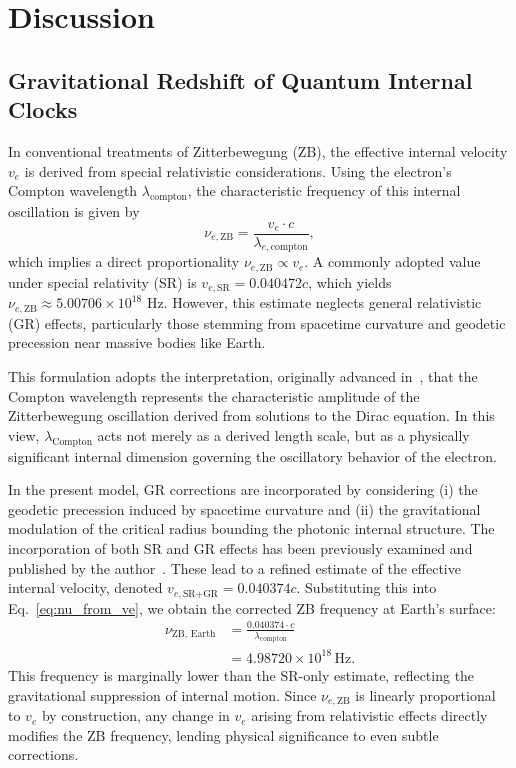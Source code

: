 \documentclass[%
 reprint,
 amsmath,amssymb,
 aps,
]{revtex4-1}
\numberwithin{equation}{section}%
\begin{document}
\section{Discussion}

\subsection{Gravitational Redshift of Quantum Internal Clocks}

In conventional treatments of Zitterbewegung (ZB), the effective internal velocity $v_e$ is derived from special relativistic considerations. Using the electron's Compton wavelength $\lambda_{\mathrm{compton}}$, the characteristic frequency of this internal oscillation is given by
\begin{equation}
\nu_{e,\text{ZB}} = \frac{v_e \cdot c}{\lambda_{e, \mathrm{compton}}},
\label{eq:nu_from_ve}
\end{equation}
which implies a direct proportionality $\nu_{e,\text{ZB}} \propto v_e$. A commonly adopted value under special relativity (SR) is $v_{e,\text{SR}} = 0.040472c$, which yields $\nu_{e,\text{ZB}} \approx 5.00706 \times 10^{18}$ Hz. However, this estimate neglects general relativistic (GR) effects, particularly those stemming from spacetime curvature and geodetic precession near massive bodies like Earth.

This formulation adopts the interpretation, originally advanced in~\cite{hanamura1811.0312}, that the Compton wavelength represents the characteristic amplitude of the Zitterbewegung oscillation derived from solutions to the Dirac equation. In this view, $\lambda_{\text{Compton}}$ acts not merely as a derived length scale, but as a physically significant internal dimension governing the oscillatory behavior of the electron.

In the present model, GR corrections are incorporated by considering (i) the geodetic precession induced by spacetime curvature and (ii) the gravitational modulation of the critical radius bounding the photonic internal structure. The incorporation of both SR and GR effects has been previously examined and published by the author~\cite{hanamura2501.0130}. These lead to a refined estimate of the effective internal velocity, denoted $v_{e,\text{SR+GR}} = 0.040374c$. Substituting this into Eq.~\ref{eq:nu_from_ve}, we obtain the corrected ZB frequency at Earth's surface:
\begin{equation}
\begin{aligned}
\nu_{\text{ZB, Earth}} &= \frac{0.040374 \cdot c}{\lambda_{\mathrm{compton}}} \\
&= 4.98720 \times 10^{18} \, \text{Hz}.
\end{aligned}
\end{equation}
This frequency is marginally lower than the SR-only estimate, reflecting the gravitational suppression of internal motion. Since $\nu_{e,\text{ZB}}$ is linearly proportional to $v_e$ by construction, any change in $v_e$ arising from relativistic effects directly modifies the ZB frequency, lending physical significance to even subtle corrections.
\end{document}
